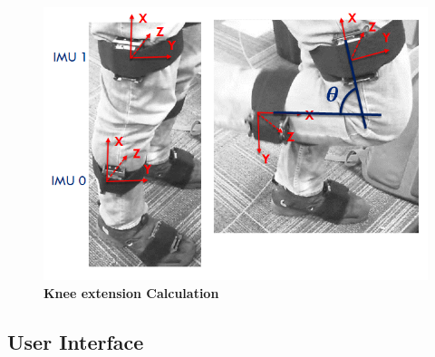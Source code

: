 \documentclass[conference]{IEEEtran}
\begin{document}
\begin{figure}[h]
  \centering
  \includegraphics[width=0.8\columnwidth]{figs/knees}
  \caption{{\bf Knee extension Calculation}}
  \label{fig:knees}
\end{figure}

\subsection{User Interface}
\end{document}
